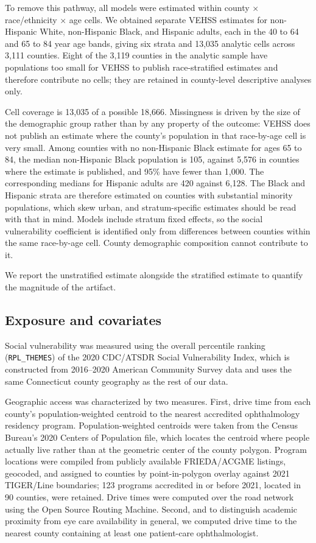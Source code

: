 \documentclass[11pt]{article}
\begin{document}
To remove this pathway, all models were estimated within county $\times$
race/ethnicity $\times$ age cells. We obtained separate VEHSS estimates for
non-Hispanic White, non-Hispanic Black, and Hispanic adults, each in the 40 to
64 and 65 to 84 year age bands, giving six strata and 13,035 analytic cells
across 3,111 counties. Eight of the 3,119 counties in the analytic sample have
populations too small for VEHSS to publish race-stratified estimates and
therefore contribute no cells; they are retained in county-level descriptive
analyses only.

Cell coverage is 13,035 of a possible 18,666. Missingness is driven by the size
of the demographic group rather than by any property of the outcome: VEHSS does
not publish an estimate where the county's population in that race-by-age cell
is very small. Among counties with no non-Hispanic Black estimate for ages 65 to
84, the median non-Hispanic Black population is 105, against 5,576 in counties
where the estimate is published, and 95\% have fewer than 1,000. The
corresponding medians for Hispanic adults are 420 against 6,128. The Black and
Hispanic strata are therefore estimated on counties with substantial minority
populations, which skew urban, and stratum-specific estimates should be read
with that in mind. Models include stratum fixed effects, so the social
vulnerability coefficient is identified only from differences between counties
within the same race-by-age cell. County demographic composition cannot
contribute to it.

We report the unstratified estimate alongside the stratified estimate to
quantify the magnitude of the artifact.

\subsection{Exposure and covariates}

Social vulnerability was measured using the overall percentile ranking
(\texttt{RPL\_THEMES}) of the 2020 CDC/ATSDR Social Vulnerability
Index,\citep{svi} which is constructed from 2016--2020 American Community Survey
data and uses the same Connecticut county geography as the rest of our data.

Geographic access was characterized by two measures. First, drive time from each
county's population-weighted centroid to the nearest accredited ophthalmology
residency program. Population-weighted centroids were taken from the Census
Bureau's 2020 Centers of Population file,\citep{cenpop} which locates the
centroid where people actually live rather than at the geometric center of the
county polygon. Program locations were compiled from publicly available
FRIEDA/ACGME listings, geocoded, and assigned to counties by point-in-polygon
overlay against 2021 TIGER/Line boundaries; 123 programs accredited in or before
2021, located in 90 counties, were retained. Drive times were computed over the
road network using the Open Source Routing Machine. Second, and to distinguish
academic proximity from eye care availability in general, we computed drive time
to the nearest county containing at least one patient-care ophthalmologist.
\end{document}
